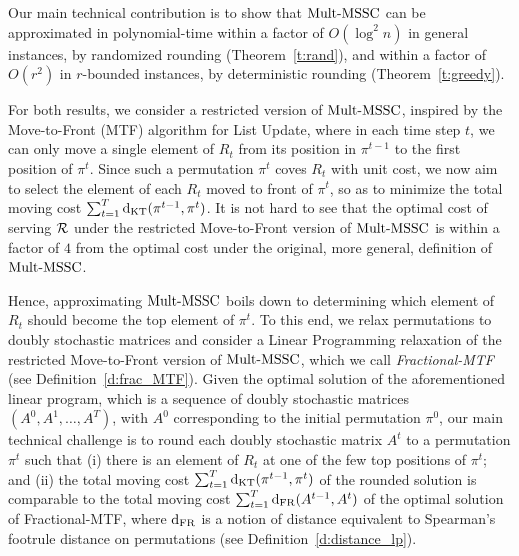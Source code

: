 Our main technical contribution is to show that $\mathrm{Mult}\text{-}\mathrm{MSSC}$ can be approximated in polynomial-time within a factor of $O(\log^2 n)$ in general instances, by randomized rounding (Theorem~\ref{t:rand}), and within a factor of $O(r^2)$ in $r$-bounded instances, by deterministic rounding (Theorem~\ref{t:greedy}). %

For both results, we consider a restricted version of $\mathrm{Mult}\text{-}\mathrm{MSSC}$, inspired by the Move-to-Front (MTF) algorithm for List Update, where in each time step $t$, we can only move a single element of $R_t$ from its position in $\pi^{t-1}$ to the first position of $\pi^t$. Since such a permutation $\pi^t$ coves $R_t$ with unit cost, we now aim to select the element of each $R_t$ moved to front of $\pi^t$, so as to minimize the total moving cost $\sum_{t=1}^T \mathrm{d}_{\mathrm{KT}}(\pi^{t-1}, \pi^t)$. It is not hard to see that the optimal cost of serving $\mathcal{R}$ under the restricted Move-to-Front version of $\mathrm{Mult}\text{-}\mathrm{MSSC}$ is within a factor of $4$ from the optimal cost under the original, more general, definition of $\mathrm{Mult}\text{-}\mathrm{MSSC}$. 

Hence, approximating $\mathrm{Mult}\text{-}\mathrm{MSSC}$ boils down to determining which element of $R_t$ should become the top element of $\pi^{t}$. To this end, we relax permutations to doubly stochastic matrices and consider a Linear Programming relaxation of the restricted Move-to-Front version of $\mathrm{Mult}\text{-}\mathrm{MSSC}$, which we call \emph{Fractional-MTF} (see Definition~\ref{d:frac_MTF}). Given the optimal solution of the aforementioned linear program, which is a sequence of doubly stochastic matrices $(A^0, A^1, \ldots, A^T)$, with $A^0$ corresponding to the initial permutation $\pi^0$, our main technical challenge is to round each doubly stochastic matrix $A^t$ to a permutation $\pi^t$ such that (i) there is an element of $R_t$ at one of the few top positions of $\pi^t$; and (ii) the total moving cost $\sum_{t=1}^T \mathrm{d}_{\mathrm{KT}}(\pi^{t-1}, \pi^t)$ of the rounded solution is comparable to the total moving cost $\sum_{t=1}^T \mathrm{d}_{\mathrm{FR}}(A^{t-1}, A^t)$ of the optimal solution of Fractional-MTF, where $\mathrm{d}_{\mathrm{FR}}$ is a notion of distance equivalent to Spearman's footrule distance on permutations (see Definition~\ref{d:distance_lp}).

